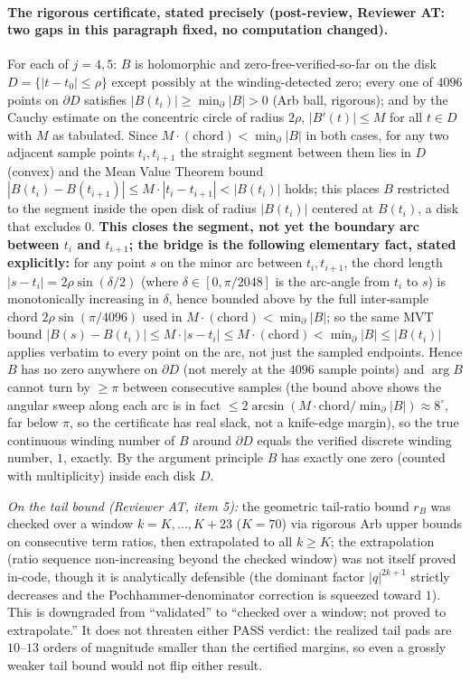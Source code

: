 \paragraph{The rigorous certificate, stated precisely (post-review, Reviewer AT: two gaps in this
paragraph fixed, no computation changed).} For each of $j=4,5$: $B$ is holomorphic and
zero-free-verified-so-far on the disk $D=\{|t-t_0|\le\rho\}$ except possibly at the winding-detected
zero; every one of $4096$ points on $\partial D$ satisfies $|B(t_i)|\ge\min_\partial|B|>0$ (Arb ball,
rigorous); and by the Cauchy estimate on the concentric circle of radius $2\rho$, $|B'(t)|\le M$ for all
$t\in D$ with $M$ as tabulated. Since $M\cdot(\text{chord}) < \min_\partial|B|$ in both cases, for any
two adjacent sample points $t_i,t_{i+1}$ the straight segment between them lies in $D$ (convex) and the
Mean Value Theorem bound $|B(t_i)-B(t_{i+1})|\le M\cdot|t_i-t_{i+1}|<|B(t_i)|$ holds; this places $B$
restricted to the segment inside the open disk of radius $|B(t_i)|$ centered at $B(t_i)$, a disk that
excludes $0$. \textbf{This closes the segment, not yet the boundary arc between $t_i$ and $t_{i+1}$;
the bridge is the following elementary fact, stated explicitly:} for any point $s$ on the minor arc
between $t_i,t_{i+1}$, the chord length $|s-t_i|=2\rho\sin(\delta/2)$ (where $\delta\in[0,\pi/2048]$ is
the arc-angle from $t_i$ to $s$) is monotonically increasing in $\delta$, hence bounded above by the
full inter-sample chord $2\rho\sin(\pi/4096)$ used in $M\cdot(\text{chord})<\min_\partial|B|$; so the
same MVT bound $|B(s)-B(t_i)|\le M\cdot|s-t_i|\le M\cdot(\text{chord})<\min_\partial|B|\le|B(t_i)|$
applies verbatim to every point on the arc, not just the sampled endpoints. Hence $B$ has no zero
anywhere on $\partial D$ (not merely at the $4096$ sample points) and $\arg B$ cannot turn by $\ge\pi$
between consecutive samples (the bound above shows the angular sweep along each arc is in fact
$\le2\arcsin(M\cdot\text{chord}/\min_\partial|B|)\approx8^\circ$, far below $\pi$, so the certificate
has real slack, not a knife-edge margin), so the true continuous winding number of $B$ around
$\partial D$ equals the verified discrete winding number, $1$, exactly. By the argument principle $B$
has exactly one zero (counted with multiplicity) inside each disk $D$.

\emph{On the tail bound (Reviewer AT, item 5):} the geometric tail-ratio bound $r_B$ was checked over
a window $k=K,\ldots,K+23$ ($K=70$) via rigorous Arb upper bounds on consecutive term ratios, then
extrapolated to all $k\ge K$; the extrapolation (ratio sequence non-increasing beyond the checked
window) was not itself proved in-code, though it is analytically defensible (the dominant factor
$|q|^{2k+1}$ strictly decreases and the Pochhammer-denominator correction is squeezed toward $1$). This
is downgraded from ``validated'' to ``checked over a window; not proved to extrapolate.'' It does not
threaten either PASS verdict: the realized tail pads are $10$--$13$ orders of magnitude smaller than
the certified margins, so even a grossly weaker tail bound would not flip either result.

